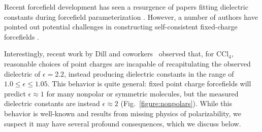 \documentclass[aps,pre,twocolumn,nofootinbib,superscriptaddress,linenumbers]{revtex4-1}
\begin{document}
Recent forcefield development has seen a resurgence of papers fitting dielectric constants during forcefield parameterization \cite{wang2014building, fennell2014fixed}.  
However, a number of authors have pointed out potential challenges in constructing self-consistent fixed-charge forcefields \cite{fennell2012simple, leontyev2014polarizable}.  

Interestingly, recent work by Dill and coworkers~\cite{fennell2012simple} observed that, for $\mathrm{CCl_4}$, reasonable choices of point charges are incapable of recapitulating the observed dielectric of $\epsilon = 2.2$, instead producing dielectric constants in the range of $1.0 \le \epsilon \le 1.05$.  
This behavior is quite general: fixed point charge forcefields will predict $\epsilon \approx 1$ for many nonpolar or symmetric molecules, but the measured dielectric constants are instead $\epsilon \approx 2$ (Fig.~\ref{figure:nonpolars}).  
While this behavior is well-known and results from missing physics of polarizability, we suspect it may have several profound consequences, which we discuss below.


\end{document}
